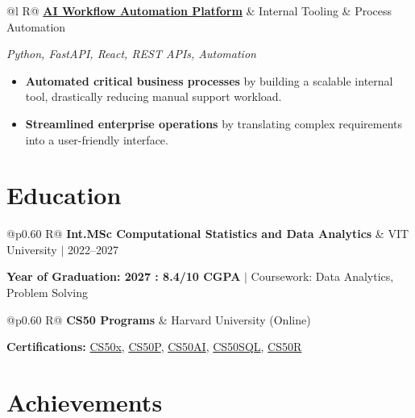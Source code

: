 \documentclass[a4paper,11pt]{article}
\newcommand{\subheading}[1]{\textbf{#1}}
\newcommand{\meta}[1]{{\fontsize{10}{12}\selectfont\textcolor[HTML]{3A3A3A}{#1}}}
\newcommand{\techstack}[1]{{\fontsize{10}{12}\selectfont\textcolor[HTML]{1A1A1A}{\textit{#1}}}}
\newcommand{\ulink}[2]{\href{#1}{#2}}
\begin{document}
\begin{tabularx}{\linewidth}{@{}l R@{}}
\subheading{\ulink{https://github.com/su-jin1425/AI-Workflow-Automation}{AI Workflow Automation Platform}} & \meta{Internal Tooling \& Process Automation}
\end{tabularx}
\techstack{Python, FastAPI, React, REST APIs, Automation}
\begin{itemize}[nosep, leftmargin=1.5em, itemsep=2pt, topsep=2pt]
  \item {\color[HTML]{0A0A0A}\fontsize{11}{14}\selectfont \textbf{Automated critical business processes} by building a scalable internal tool, drastically reducing manual support workload.}
  \item {\color[HTML]{0A0A0A}\fontsize{11}{14}\selectfont \textbf{Streamlined enterprise operations} by translating complex requirements into a user-friendly interface.}
\end{itemize}

\section{Education}
\vspace{2pt}

\begin{tabularx}{\linewidth}{@{}p{0.60\linewidth} R@{}}
\subheading{Int.MSc Computational Statistics and Data Analytics} & \meta{VIT University $|$ 2022--2027}
\end{tabularx}
{\color[HTML]{3A3A3A}\fontsize{11}{14}\selectfont \textbf{Year of Graduation: 2027 : 8.4/10 CGPA} $|$ Coursework: Data Analytics, Problem Solving}

\begin{tabularx}{\linewidth}{@{}p{0.60\linewidth} R@{}}
\subheading{CS50 Programs} & \meta{Harvard University (Online)}
\end{tabularx}
{\color[HTML]{3A3A3A}\fontsize{11}{14}\selectfont \textbf{Certifications:} \ulink{https://cs50.harvard.edu/certificates/b14b78df-e05c-413e-a607-1dd27303053a}{CS50x}, \ulink{https://cs50.harvard.edu/certificates/32477052-9db4-49c4-a5a4-d7e58429ca2c}{CS50P}, \ulink{https://cs50.harvard.edu/certificates/9cdb4d4a-1250-4f8e-9fd7-191864e0f919}{CS50AI}, \ulink{https://cs50.harvard.edu/certificates/bc486f24-f085-4e61-8536-80940b97a1b9}{CS50SQL}, \ulink{https://cs50.harvard.edu/certificates/666838e6-a053-4d82-b179-a60fe745fd84}{CS50R}}

\section{Achievements}
\vspace{2pt}
\end{document}
